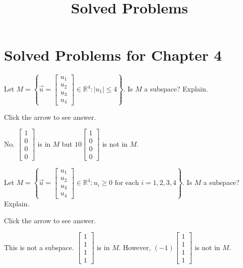\documentclass{ximera}
\title{Solved Problems} \license{CC BY-NC-SA 4.0}
\begin{document}
\begin{abstract}
\end{abstract}
\maketitle

\section*{Solved Problems for Chapter 4}

\begin{problem}\label{prb:5.10} Let $M=\left\{ \vec{u}=\left[ \begin{array}{c}
u_{1} \\
u_{2} \\
u_{3} \\
u_{4}
\end{array}\right] \in
\mathbb{R}^{4}:|u_{1}| \leq 4\right\} .$ Is $M$ a
subspace? Explain.

Click the arrow to see answer.  
\begin{expandable}
No. $\left[
\begin{array}{r}
1 \\
0 \\
0 \\
0
\end{array}
\right]$ is in $M$ but $10\left[ \begin{array}{r}
1 \\
0 \\
0 \\
0
\end{array}
\right]$ is not in $M$.
\end{expandable}
\end{problem}

\begin{problem}\label{prb:5.11} Let $M=\left\{ \vec{u}=\left[ \begin{array}{c}
u_{1} \\
u_{2} \\
u_{3} \\
u_{4}
\end{array}\right] \in
\mathbb{R}^{4}:u_{i}\geq 0\text{ for each }i=1,2,3,4\right\} .$ Is $M$ a
subspace? Explain.

Click the arrow to see answer.  
\begin{expandable}
This is not a subspace. $\left[ \begin{array}{r}
1 \\
1 \\
1 \\
1
\end{array}
\right] $
is in $M$. However, $\left( -1\right) \left[
\begin{array}{r}
1 \\
1 \\
1 \\
1
\end{array}
\right] $ is not in $M$.
\end{expandable}
\end{problem}
\end{document}
